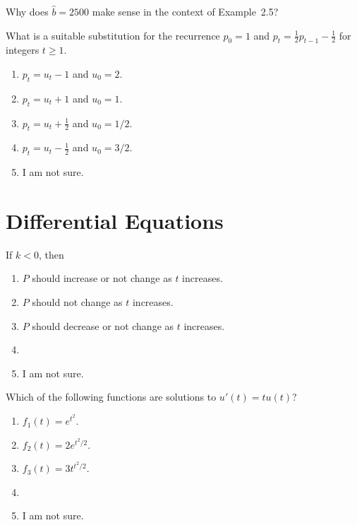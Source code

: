 \documentclass[t, 14pt]{beamer}
\begin{document}
\begin{frame}
  Why does \(\hat{b} = 2500\) make sense in the context of Example~2.5?
\end{frame}


\begin{frame}
  What is a suitable substitution for the recurrence \(p_{0} = 1\) and \(p_{t} = \tfrac{1}{2} p_{t-1} - \tfrac{1}{2}\) for integers \(t \ge 1\).

  \begin{enumerate} 
    \item \(p_{t} = u_{t} - 1\) and \(u_{0} = 2\).
    \item \(p_{t} = u_{t} + 1\) and \(u_{0} = 1\).
    \item \(p_{t} = u_{t} + \frac{1}{2}\) and \(u_{0} = 1/2\).
    \item \(p_{t} = u_{t} - \frac{1}{2}\) and \(u_{0} = 3/2\).
    \item I am not sure. 
  \end{enumerate}
\end{frame}

\section{Differential Equations}

\begin{frame}
  If \(k < 0\), then 

  \begin{enumerate} 
    \item \(P\) should increase or not change as \(t\) increases.
    \item \(P\) should not change as \(t\) increases.
    \item \(P\) should decrease or not change as \(t\) increases.
    \item 
    \item I am not sure. 
  \end{enumerate}
\end{frame}

\begin{frame}
  Which of the following functions are solutions to \(u'(t) = tu(t)\)?

  \begin{enumerate} 
    \item \(f_{1}(t) = e^{t^{2}}\).
    \item \(f_{2}(t) = 2 e^{t^{2}/2}\).
    \item \(f_{3}(t) = 3 t^{t^{2}/2}\).
    \item 
    \item I am not sure. 
  \end{enumerate}
\end{frame}
\end{document}
